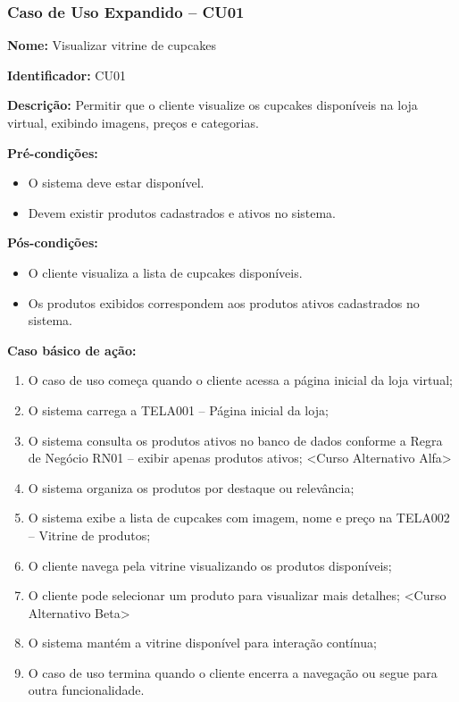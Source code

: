 \documentclass[12pt]{article}
\begin{document}
\subsubsection{Caso de Uso Expandido -- CU01}

\textbf{Nome:} Visualizar vitrine de cupcakes

\textbf{Identificador:} CU01

\textbf{Descrição:} Permitir que o cliente visualize os cupcakes disponíveis na loja virtual, exibindo imagens, preços e categorias.

\textbf{Pré-condições:}
\begin{itemize}
\item O sistema deve estar disponível.
\item Devem existir produtos cadastrados e ativos no sistema.
\end{itemize}

\textbf{Pós-condições:}
\begin{itemize}
\item O cliente visualiza a lista de cupcakes disponíveis.
\item Os produtos exibidos correspondem aos produtos ativos cadastrados no sistema.
\end{itemize}

\textbf{Caso básico de ação:}

\begin{enumerate}
\item O caso de uso começa quando o cliente acessa a página inicial da loja virtual;
\item O sistema carrega a TELA001 -- Página inicial da loja;
\item O sistema consulta os produtos ativos no banco de dados conforme a Regra de Negócio RN01 -- exibir apenas produtos ativos; <Curso Alternativo Alfa>
\item O sistema organiza os produtos por destaque ou relevância;
\item O sistema exibe a lista de cupcakes com imagem, nome e preço na TELA002 -- Vitrine de produtos;
\item O cliente navega pela vitrine visualizando os produtos disponíveis;
\item O cliente pode selecionar um produto para visualizar mais detalhes; <Curso Alternativo Beta>
\item O sistema mantém a vitrine disponível para interação contínua;
\item O caso de uso termina quando o cliente encerra a navegação ou segue para outra funcionalidade.
\end{enumerate}
\end{document}
